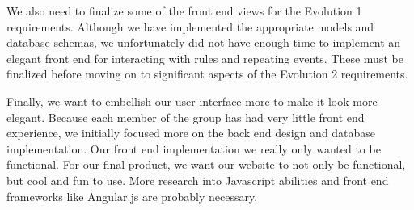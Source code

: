 \documentclass[11pt]{article}
\begin{document}
We also need to finalize some of the front end views for the Evolution 1 requirements.  Although we have implemented the appropriate models and database schemas, we unfortunately did not have enough time to implement an elegant front end for interacting with rules and repeating events.  These must be finalized before moving on to significant aspects of the Evolution 2 requirements.

Finally, we want to embellish our user interface more to make it look more elegant.  Because each member of the group has had very little front end experience, we initially focused more on the back end design and database implementation.  Our front end implementation we really only wanted to be functional.  For our final product, we want our website to not only be functional, but cool and fun to use.  More research into Javascript abilities and front end frameworks like Angular.js are probably necessary.
\end{document}

